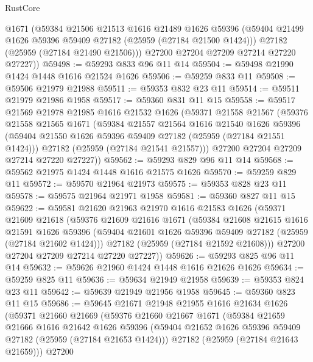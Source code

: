 \begin{lexlean}{RustCore}
\begin{coremodule}
        @1671
        (@59384
          @21506
          @21513
          @1616
          @21489
          @1626
          @59396
          (@59404 @21499 @1626 @59396 @59409 @27182 (@25959 (@27184 @21500 @1424)))
          @27182
          (@25959 (@27184 @21490 @21506)))
        @27200
        @27204
        @27209
        @27214
        @27220
        @27227))
@59498 := @59293 @833 @96 @11 @14
@59504 := @59498 @21990 @1424 @1448 @1616 @21524 @1626
@59506 := @59259 @833 @11
@59508 := @59506 @21979 @21988
@59511 := @59353 @832 @23 @11
@59514 := @59511 @21979 @21986 @1958
@59517 := @59360 @831 @11 @15
@59558 := @59517
    @21569
    @21978
    @21985
    @1616
    @21532
    @1626
    (@59371
      @21558
      @21567
      (@59376
        @21558
        @21565
        @1671
        (@59384
          @21557
          @21564
          @1616
          @21540
          @1626
          @59396
          (@59404 @21550 @1626 @59396 @59409 @27182 (@25959 (@27184 @21551 @1424)))
          @27182
          (@25959 (@27184 @21541 @21557)))
        @27200
        @27204
        @27209
        @27214
        @27220
        @27227))
@59562 := @59293 @829 @96 @11 @14
@59568 := @59562 @21975 @1424 @1448 @1616 @21575 @1626
@59570 := @59259 @829 @11
@59572 := @59570 @21964 @21973
@59575 := @59353 @828 @23 @11
@59578 := @59575 @21964 @21971 @1958
@59581 := @59360 @827 @11 @15
@59622 := @59581
    @21620
    @21963
    @21970
    @1616
    @21583
    @1626
    (@59371
      @21609
      @21618
      (@59376
        @21609
        @21616
        @1671
        (@59384
          @21608
          @21615
          @1616
          @21591
          @1626
          @59396
          (@59404 @21601 @1626 @59396 @59409 @27182 (@25959 (@27184 @21602 @1424)))
          @27182
          (@25959 (@27184 @21592 @21608)))
        @27200
        @27204
        @27209
        @27214
        @27220
        @27227))
@59626 := @59293 @825 @96 @11 @14
@59632 := @59626 @21960 @1424 @1448 @1616 @21626 @1626
@59634 := @59259 @825 @11
@59636 := @59634 @21949 @21958
@59639 := @59353 @824 @23 @11
@59642 := @59639 @21949 @21956 @1958
@59645 := @59360 @823 @11 @15
@59686 := @59645
    @21671
    @21948
    @21955
    @1616
    @21634
    @1626
    (@59371
      @21660
      @21669
      (@59376
        @21660
        @21667
        @1671
        (@59384
          @21659
          @21666
          @1616
          @21642
          @1626
          @59396
          (@59404 @21652 @1626 @59396 @59409 @27182 (@25959 (@27184 @21653 @1424)))
          @27182
          (@25959 (@27184 @21643 @21659)))
        @27200

\end{coremodule}
\end{lexlean}
